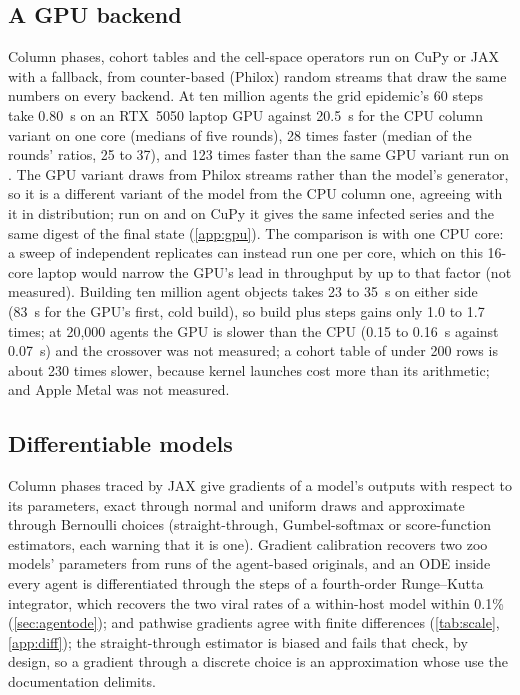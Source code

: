 \subsection{A GPU backend}
\label{sec:gpu}

Column phases, cohort tables and the cell-space operators run on CuPy or JAX with a
 fallback, from counter-based (Philox) random streams that draw the same numbers
on every backend. At ten million agents the grid epidemic's 60 steps take 0.80~s on an
RTX~5050 laptop GPU against 20.5~s for the CPU column variant on one core (medians of five
rounds), 28 times faster (median of the rounds' ratios, 25 to 37), and 123 times faster than the same GPU variant run on . The GPU variant draws from Philox streams rather than the model's
generator, so it is a different variant of the model from the CPU column one, agreeing with it
in distribution; run on  and on CuPy it gives the same infected series and the same
digest of the final state (\cref{app:gpu}). The comparison is with one CPU core: a sweep of independent replicates can instead run one
per core, which on this 16-core laptop would narrow the GPU's lead in throughput by up to that
factor (not measured). Building ten million agent objects takes 23 to
35~s on either side (83~s for the GPU's first, cold build), so build plus steps gains only 1.0
to 1.7 times; at 20,000 agents the GPU is slower than the CPU (0.15 to 0.16~s against 0.07~s) and the crossover was not
measured; a cohort
table of under 200 rows is about 230 times slower, because kernel launches cost more than its
arithmetic; and Apple Metal was not measured.

\subsection{Differentiable models}
\label{sec:diff}

Column phases traced by JAX give gradients of a model's outputs with respect to its
parameters, exact through normal and uniform draws and approximate through Bernoulli choices
(straight-through, Gumbel-softmax or score-function estimators, each warning that it is one).
Gradient calibration recovers two zoo models' parameters from runs of the agent-based
originals, and an ODE inside every agent is differentiated through the steps of a
fourth-order Runge--Kutta integrator, which recovers the two viral rates of a within-host
model within 0.1\% (\cref{sec:agentode}); and pathwise gradients agree with finite differences (\cref{tab:scale},
\cref{app:diff}); the straight-through estimator is biased and fails that check, by design, so
a gradient through a discrete choice is an approximation whose use the documentation delimits.

